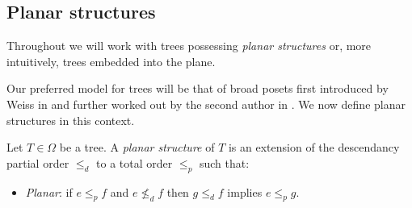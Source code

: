 \documentclass[a4paper,10pt]{article}%
\begin{document}
\subsection{Planar structures}


Throughout we will work with trees possessing \textit{planar structures} or, more intuitively, trees embedded into the plane.

Our preferred model for trees will be that of broad posets first introduced by Weiss in \cite{We12} and further worked out by the second author in \cite{Pe17}. We now define planar structures in this context.


\begin{definition}\label{PLANARIZE DEF}
	Let $T \in \Omega$ be a tree. A \textit{planar structure} of $T$ is an extension of the descendancy partial order $\leq_d$ to a total order $\leq_p$ such that: 
	\begin{itemize}
		\item \textit{Planar}: if $e \leq_p f$ and $e \nleq_d f$ then 
		$g \leq_d f$ implies $e \leq_p g$.
	\end{itemize} 
\end{definition}
\end{document}
